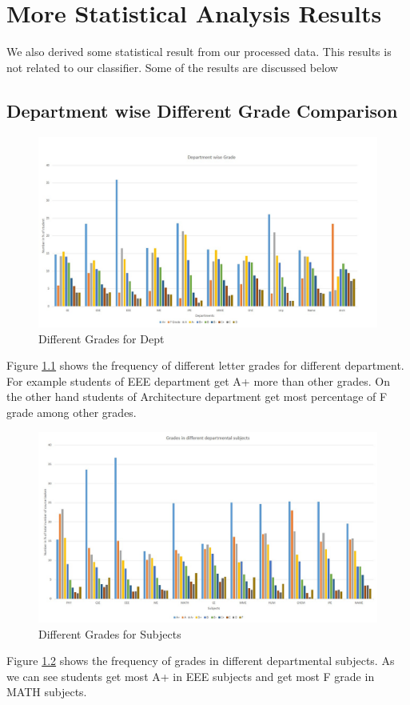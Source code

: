 
\chapter{More Statistical Analysis Results} %

\label{Appendix B} %

We also derived some statistical result from our processed data. This results is not related to our classifier.
Some of the results are discussed below 
\section{Department wise Different Grade Comparison}

\begin{figure}[H]
   \centering
  \includegraphics[width=\linewidth]{Figures/deptgrade.jpg}
  \decoRule
  \caption[Different Grades for Dept]{Different Grades for Dept}
  \label{fig:Different Grades for Dept}
\end{figure}

Figure \ref{fig:Different Grades for Dept} shows the frequency of different letter grades for different department.
For example students of EEE department get A+ more than other grades. On the other hand students of Architecture department get most percentage of F grade among other grades. 


\begin{figure}[H]
   \centering
  \includegraphics[width=\linewidth]{Figures/depresult.jpg}
  \decoRule
  \caption[Different Grades for Subjects]{Different Grades for Subjects}
  \label{fig:Different Grades for Subjects}
\end{figure}


Figure \ref{fig:Different Grades for Subjects} shows the frequency of grades in different departmental subjects.
As we can see students get most A+ in EEE subjects and get most F grade in MATH subjects.

